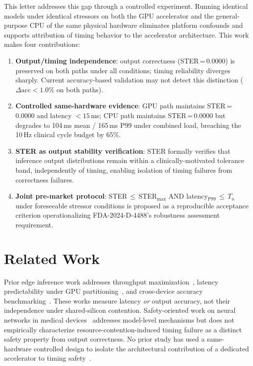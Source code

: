 \documentclass[journal,10pt,twocolumn]{IEEEtran}
\begin{document}
This letter addresses this gap through a controlled experiment.
Running identical models under identical stressors on both the GPU
accelerator and the general-purpose CPU of the same physical hardware
eliminates platform confounds and supports attribution of timing behavior
to the accelerator architecture.
This work makes four contributions:
\begin{enumerate}
  \item \textbf{Output/timing independence}: output correctness (STER\,=\,0.0000)
    is preserved on both paths under all conditions; timing reliability
    diverges sharply. Current accuracy-based validation may not detect
    this distinction ($\Delta\mathrm{acc}{<}1.0\%$ on both paths).
  \item \textbf{Controlled same-hardware evidence}: GPU path maintains
    STER\,=\,0.0000 and latency ${<}15$\,ms; CPU path maintains
    STER\,=\,0.0000 but degrades to 104\,ms mean / 165\,ms P99 under
    combined load, breaching the 10\,Hz clinical cycle budget by 65\%.
  \item \textbf{STER as output stability verification}: STER formally
    verifies that inference output distributions remain within a
    clinically-motivated tolerance band, independently of timing, enabling
    isolation of timing failures from correctness failures.
  \item \textbf{Joint pre-market protocol}: STER\,$\leq$\,STER$_{\max}$
    AND latency$_{\mathrm{P99}}$\,$\leq$\,$T_n$ under foreseeable stressor
    conditions is proposed as a reproducible acceptance criterion
    operationalizing FDA-2024-D-4488's robustness assessment requirement.
\end{enumerate}

\section{Related Work}

Prior edge inference work addresses throughput maximization~\cite{hao2023},
latency predictability under GPU partitioning~\cite{martin2026}, and
cross-device accuracy benchmarking~\cite{baller2021,tobiasz2023}.
These works measure latency \emph{or} output accuracy, not their
independence under shared-silicon contention.
Safety-oriented work on neural networks in medical devices~\cite{becker2019}
addresses model-level mechanisms but does not empirically characterize
resource-contention-induced timing failure as a distinct safety property
from output correctness.
No prior study has used a same-hardware controlled design to isolate the
architectural contribution of a dedicated accelerator to timing
safety~\cite{martin2026}.
\end{document}
